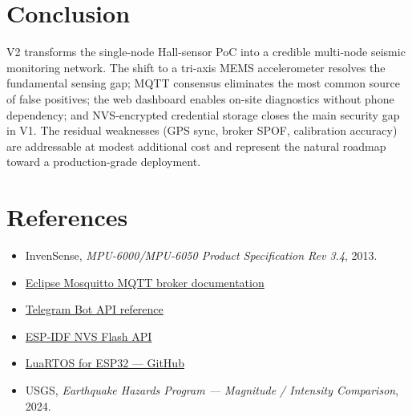 \documentclass[11pt,a4paper]{article}
\begin{document}
\section{Conclusion}

V2 transforms the single-node Hall-sensor PoC into a credible multi-node seismic monitoring network. The shift to a tri-axis MEMS accelerometer resolves the fundamental sensing gap; MQTT consensus eliminates the most common source of false positives; the web dashboard enables on-site diagnostics without phone dependency; and NVS-encrypted credential storage closes the main security gap in V1. The residual weaknesses (GPS sync, broker SPOF, calibration accuracy) are addressable at modest additional cost and represent the natural roadmap toward a production-grade deployment.

\section*{References}

\begin{itemize}[noitemsep]
  \item InvenSense, \textit{MPU-6000/MPU-6050 Product Specification Rev 3.4}, 2013.
  \item \href{https://mosquitto.org/}{Eclipse Mosquitto MQTT broker documentation}
  \item \href{https://core.telegram.org/bots/api}{Telegram Bot API reference}
  \item \href{https://docs.espressif.com/projects/esp-idf/en/latest/esp32/api-reference/storage/nvs_flash.html}{ESP-IDF NVS Flash API}
  \item \href{https://github.com/whitecatboard/Lua-RTOS-ESP32}{LuaRTOS for ESP32 — GitHub}
  \item USGS, \textit{Earthquake Hazards Program — Magnitude / Intensity Comparison}, 2024.
\end{itemize}
\end{document}
